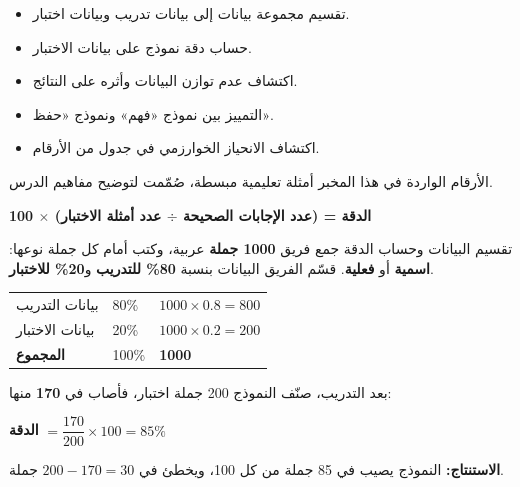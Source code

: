 \documentclass[a4paper]{article}
\begin{document}

\begin{itemize}
    \item تقسيم مجموعة بيانات إلى بيانات تدريب وبيانات اختبار.
    \item حساب دقة نموذج على بيانات الاختبار.
    \item اكتشاف عدم توازن البيانات وأثره على النتائج.
    \item التمييز بين نموذج «فهم» ونموذج «حفظ».
    \item اكتشاف الانحياز الخوارزمي في جدول من الأرقام.
\end{itemize}

\begin{tanbih}
    الأرقام الواردة في هذا المخبر أمثلة تعليمية مبسطة، صُمّمت لتوضيح مفاهيم الدرس.
\end{tanbih}

\nisba

\begin{tadhkir}
    \begin{center}
        \textbf{الدقة = (عدد الإجابات الصحيحة $\div$ عدد أمثلة الاختبار) $\times$ 100}
    \end{center}
\end{tadhkir}


\begin{mithal}{تقسيم البيانات وحساب الدقة}
جمع فريق \textbf{1000 جملة} عربية، وكتب أمام كل جملة نوعها: \textbf{اسمية} أو \textbf{فعلية}.
قسّم الفريق البيانات بنسبة \textbf{80\% للتدريب} و\textbf{20\% للاختبار}.

\begin{center}
\begin{tabular}{|R{4.5cm}|C{3cm}|C{3cm}|}
    \hline
     &  &  \\ \hline
    بيانات التدريب   & 80\%  & $1000 \times 0.8 = 800$ \\ \hline
    بيانات الاختبار  & 20\%  & $1000 \times 0.2 = 200$ \\ \hline
    \textbf{المجموع} & 100\% & \textbf{1000} \\ \hline
\end{tabular}
\end{center}

بعد التدريب، صنّف النموذج 200 جملة اختبار، فأصاب في \textbf{170} منها:
\begin{center}
    \textbf{الدقة} $= \dfrac{170}{200} \times 100 = 85\%$
\end{center}
\textbf{الاستنتاج:} النموذج يصيب في 85 جملة من كل 100،
ويخطئ في $200 - 170 = 30$ جملة.
\end{mithal}
\end{document}
